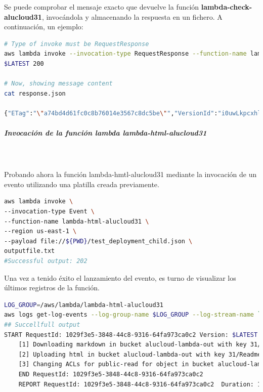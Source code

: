 \documentclass[
]{article}
\begin{document}
Se puede comprobar el mensaje exacto que devuelve la función \textbf{lambda-check-alucloud31}, invocándola y almacenando la respuesta en un fichero. A continuación, un ejemplo: 

\begin{lstlisting}[language=bash,caption={Invocación de la funcion lambda-check-alucloud31}]
# Type of invoke must be RequestResponse
aws lambda invoke --invocation-type RequestResponse --function-name lambda-check-alucloud31 --region us-east-1 --payload file://${PWD}/test_deployment_nodechild.json response.json
$LATEST	200

# Now, showing message content
cat response.json 

{"ETag":"\"a74bd4d61fc0c8b76014e3567c8dc5be\"","VersionId":"i0uwLkpcxhl2zufHMkzNSVK3Sh5SBdc7","Location":"https://alucloud-lambda-out.s3.amazonaws.com/31/ListOfResult.html","key":"31/ListOfResult.html","Key":"31/ListOfResult.html","Bucket":"alucloud-lambda-out","message":"Check and Summary HTML Created"}
\end{lstlisting}

\newpage
\hypertarget{header-n200}{%
\subparagraph{Invocación de la función lambda
lambda-html-alucloud31}\label{header-n200}}
\leavevmode
\\
\\
Probando ahora la función lambda-hmtl-alucloud31 mediante la invocación de un evento utilizando una platilla creada previamente.
\begin{lstlisting}[language=bash,caption={Invocar evento}]
aws lambda invoke \
--invocation-type Event \
--function-name lambda-html-alucloud31 \
--region us-east-1 \
--payload file://${PWD}/test_deployment_child.json \
outputfile.txt
#Successful output: 202
\end{lstlisting}

Una vez a tenido éxito el lanzamiento del evento, es turno de visualizar
los últimos registros de la función.

\begin{lstlisting}[language=bash,caption={Logs de la función}]
LOG_GROUP=/aws/lambda/lambda-html-alucloud31
aws logs get-log-events --log-group-name $LOG_GROUP --log-stream-name `aws logs describe-log-streams --log-group-name $LOG_GROUP --max-items 1 --order-by LastEventTime --descending --query logStreams[].logStreamName --output text | head -n 1` --query events[].message --output text
## Succellfull output
START RequestId: 1029f3e5-3848-44c8-9316-64fa973ca0c2 Version: $LATEST
	[1] Downloading markdown in bucket alucloud-lambda-out with key 31/Readme.html
	[2] Uploading html in bucket alucloud-lambda-out with key 31/Readme.txt
	[3] Changing ACLs for public-read for object in bucket alucloud-lambda-out with key 31/Readme.txt
	END RequestId: 1029f3e5-3848-44c8-9316-64fa973ca0c2
	REPORT RequestId: 1029f3e5-3848-44c8-9316-64fa973ca0c2	Duration: 1462.16 ms	Billed Duration: 1463 ms	Memory Size: 128 MB	Max Memory Used: 78 MB	Init Duration: 477.93 ms	
\end{lstlisting}
\end{document}
